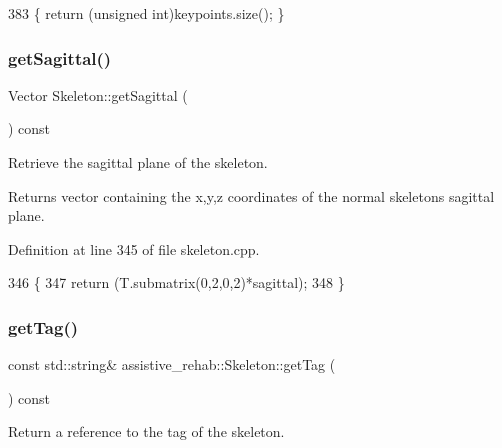\begin{DoxyCode}
383 \{ \textcolor{keywordflow}{return} (\textcolor{keywordtype}{unsigned} \textcolor{keywordtype}{int})keypoints.size(); \}
\end{DoxyCode}
\mbox{\label{classassistive__rehab_1_1Skeleton_a83133fabc903ddd4e54edf59df977167}} 
\subsubsection{\texorpdfstring{get\+Sagittal()}{getSagittal()}}
{\footnotesize\ttfamily Vector Skeleton\+::get\+Sagittal (\begin{DoxyParamCaption}{ }\end{DoxyParamCaption}) const}



Retrieve the sagittal plane of the skeleton. 

\begin{DoxyReturn}{Returns}
vector containing the x,y,z coordinates of the normal skeleton\textquotesingle{}s sagittal plane. 
\end{DoxyReturn}


Definition at line 345 of file skeleton.\+cpp.


\begin{DoxyCode}
346 \{
347     \textcolor{keywordflow}{return} (T.submatrix(0,2,0,2)*sagittal);
348 \}
\end{DoxyCode}
\mbox{\label{classassistive__rehab_1_1Skeleton_a185654045d5e43b3853cdb8fdd676da6}} 
\subsubsection{\texorpdfstring{get\+Tag()}{getTag()}}
{\footnotesize\ttfamily const std\+::string\& assistive\+\_\+rehab\+::\+Skeleton\+::get\+Tag (\begin{DoxyParamCaption}{ }\end{DoxyParamCaption}) const\hspace{0.3cm}{\ttfamily [inline]}}



Return a reference to the tag of the skeleton. 

